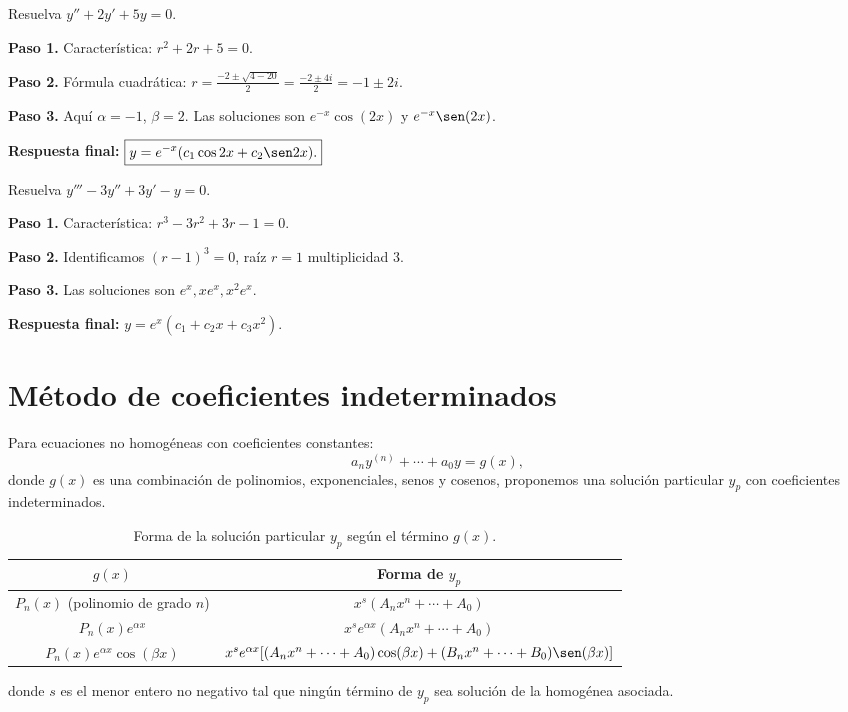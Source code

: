 \begin{example}
Resuelva $y'' + 2y' + 5y = 0$.

\begin{myproof}
\textbf{Paso 1.} Característica: $r^2 + 2r + 5 = 0$.

\textbf{Paso 2.} Fórmula cuadrática: $r = \frac{-2 \pm \sqrt{4-20}}{2} = \frac{-2 \pm 4i}{2} = -1 \pm 2i$.

\textbf{Paso 3.} Aquí $\alpha = -1$, $\beta = 2$. Las soluciones son $e^{-x}\cos(2x)$ y $e^{-x}\sen(2x)$.

\textbf{Respuesta final:} $\boxed{y = e^{-x}(c_1 \cos 2x + c_2 \sen 2x).}$
\end{myproof}
\end{example}

\begin{example}
Resuelva $y''' - 3y'' + 3y' - y = 0$.

\begin{myproof}
\textbf{Paso 1.} Característica: $r^3 - 3r^2 + 3r - 1 = 0$.

\textbf{Paso 2.} Identificamos $(r-1)^3 = 0$, raíz $r=1$ multiplicidad 3.

\textbf{Paso 3.} Las soluciones son $e^{x}, x e^{x}, x^2 e^{x}$.

\textbf{Respuesta final:} $\boxed{y = e^{x}(c_1 + c_2 x + c_3 x^2).}$
\end{myproof}
\end{example}

\section{Método de coeficientes indeterminados}

Para ecuaciones no homogéneas con coeficientes constantes:
\[
a_n y^{(n)} + \cdots + a_0 y = g(x),
\]
donde $g(x)$ es una combinación de polinomios, exponenciales, senos y cosenos, proponemos una solución particular $y_p$ con coeficientes indeterminados.

\begin{definition}
\begin{table}[H]
\centering
\begin{tabular}{c|c}
$g(x)$ & Forma de $y_p$ \\ \hline
$P_n(x)$ (polinomio de grado $n$) & $x^s (A_n x^n + \cdots + A_0)$ \\
$P_n(x) e^{\alpha x}$ & $x^s e^{\alpha x}(A_n x^n + \cdots + A_0)$ \\
$P_n(x) e^{\alpha x}\cos(\beta x)$ & $x^s e^{\alpha x}[(A_n x^n + \cdots + A_0)\cos(\beta x) + (B_n x^n + \cdots + B_0)\sen(\beta x)]$ \\
\end{tabular}
\caption{Forma de la solución particular $y_p$ según el término $g(x)$.}
\end{table}
donde $s$ es el menor entero no negativo tal que ningún término de $y_p$ sea solución de la homogénea asociada.
\end{definition}

